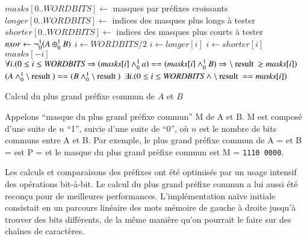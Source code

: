%


\begin{algorithm}
\begin{algorithmic}
\State $\mathit{masks}[ 0 .. \mathit{WORDBITS} ] \gets$ masques par préfixes croissants
\State $\mathit{longer}[ 0 .. \mathit{WORDBITS} ] \gets$ indices des masques plus longs à tester
\State $\mathit{shorter}[ 0 .. \mathit{WORDBITS} ] \gets$ indices des masques plus courts à tester
\State $\mathit{nxor} \gets \lnot_0^1(A \oplus_0^1 B)$
\State $i \gets \mathit{WORDBITS}/2$
    \State $i \gets \mathit{longer}[i]$ 
  \Else
    \State $i \gets \mathit{shorter}[i]$
  \EndIf
\EndWhile\\
\Return $masks[-i]$
\Ensure $\forall i. (0 \le i \le \mathit{WORDBITS} \Rightarrow (\mathit{masks}[i] \Band a) == (\mathit{masks}[i] \Band B) \Rightarrow \mresult \ge \mathit{masks}[i])$
\Ensure $(A \Band \mresult) == (B \Band \mresult)$
\Ensure $\exists i. (0 \le i \le \mathit{WORDBITS} \land \mresult == \mathit{masks}[i])$
\end{algorithmic}
\caption{Calcul du plus grand préfixe commun de $A$ et $B$
  \label{algo:prefix}}
\end{algorithm}


Appelons ``masque du plus grand préfixe commun'' M de A et B. M est composé
d'une suite de $n$ ``1'', suivie d'une suite de ``0'', où $n$ est le nombre de
bits communs entre A et B.
Par exemple, le plus grand préfixe commun de A =  et
B =  est P =   et le
masque du plus grand préfixe commun est M = \texttt{1110\,0000}.

Les calculs et comparaisons des préfixes ont été optimisés par un usage
intensif des opérations bit-à-bit.
Le calcul du plus grand préfixe commun a lui aussi été reconçu pour de
meilleures performances.
L'implémentation naïve initiale consistait en un parcours linéaire des mots
mémoire de gauche à droite jusqu'à trouver des bits différents, de la même
manière qu'on pourrait le faire sur des chaînes de caractères.

